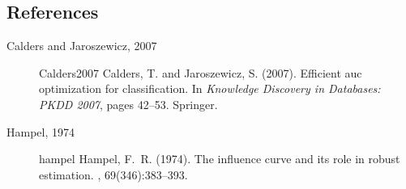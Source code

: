 \documentclass[12pt]{article}
\begin{document}
%        
%
%        

\subsection*{References}

\begin{description}

\item[Calders and Jaroszewicz, 2007]{Calders2007}
Calders, T. and Jaroszewicz, S. (2007).
\newblock Efficient auc optimization for classification.
\newblock In {\em Knowledge Discovery in Databases: PKDD 2007}, pages 42--53.
  Springer.

\item[Hampel, 1974]{hampel}
Hampel, F.~R. (1974).
\newblock The influence curve and its role in robust estimation.
,
  69(346):383--393.
  
\end{description}
\end{document}
